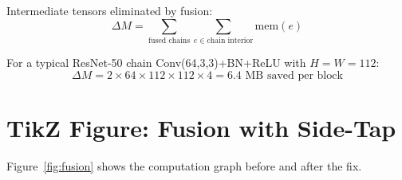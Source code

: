 \documentclass[12pt]{article}
\theoremstyle{definition}
\begin{document}
Intermediate tensors eliminated by fusion:
\begin{equation}
\Delta M = \sum_{\text{fused chains}} \sum_{e \in \text{chain interior}} \text{mem}(e)
\end{equation}

For a typical ResNet-50 chain Conv(64,3,3)+BN+ReLU with $H=W=112$:
\begin{equation}
\Delta M = 2 \times 64 \times 112 \times 112 \times 4 = 6.4 \text{ MB saved per block}
\end{equation}

\section{TikZ Figure: Fusion with Side-Tap}

Figure~\ref{fig:fusion} shows the computation graph before and after the fix.
\end{document}
